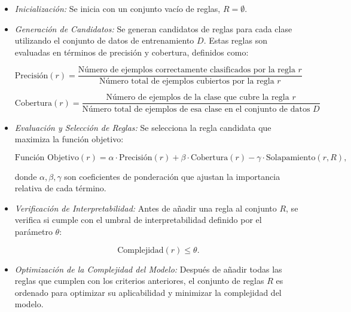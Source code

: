 \begin{itemize}
    \item \textit{Inicialización:} Se inicia con un conjunto vacío de reglas, \( R = \emptyset \).
    
    \item \textit{Generación de Candidatos:} Se generan candidatos de reglas para cada clase utilizando el conjunto de datos de entrenamiento \( D \). Estas reglas son evaluadas en términos de precisión y cobertura, definidos como:

    \begin{equation}
    \text{Precisión}(r) = \frac{\text{Número de ejemplos correctamente clasificados por la regla } r}{\text{Número total de ejemplos cubiertos por la regla } r}
    \end{equation}
    
    \begin{equation}
    \text{Cobertura}(r) = \frac{\text{Número de ejemplos de la clase que cubre la regla } r}{\text{Número total de ejemplos de esa clase en el conjunto de datos } D}
    \end{equation}
    
    \item \textit{Evaluación y Selección de Reglas:} Se selecciona la regla candidata que maximiza la función objetivo:
    
    \begin{equation}
    \text{Función Objetivo}(r) = \alpha \cdot \text{Precisión}(r) + \beta \cdot \text{Cobertura}(r) - \gamma \cdot \text{Solapamiento}(r, R),
    \end{equation}
    
    donde \( \alpha, \beta, \gamma \) son coeficientes de ponderación que ajustan la importancia relativa de cada término.

    \item \textit{Verificación de Interpretabilidad:} Antes de añadir una regla al conjunto \( R \), se verifica si cumple con el umbral de interpretabilidad definido por el parámetro \( \theta \):
    
    \begin{equation}
    \text{Complejidad}(r) \leq \theta.
    \end{equation}
    
    \item \textit{Optimización de la Complejidad del Modelo:} Después de añadir todas las reglas que cumplen con los criterios anteriores, el conjunto de reglas \( R \) es ordenado para optimizar su aplicabilidad y minimizar la complejidad del modelo.
\end{itemize}


